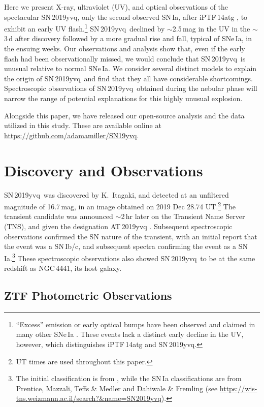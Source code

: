 \documentclass[twocolumn]{aastex63}
\newcommand{\sn}{SN\,2019yvq}
\begin{document}
Here we present X-ray, ultraviolet (UV), and optical observations of the
spectacular \sn, only the second observed SN\,Ia, after iPTF\,14atg
\citep{Cao15}, to exhibit an early UV flash.\footnote{``Excess'' emission or
early optical bumps have been observed and claimed in many other SNe\,Ia
\citep[e.g.,][]{Goobar15,Marion16,Hosseinzadeh17,Jiang17,Shappee19,
Dimitriadis19}. These events lack a distinct early decline in the UV, however,
which distinguishes iPTF\,14atg and \sn.} \sn\ declined by $\sim$2.5\,mag in
the UV in the $\sim$3\,d after discovery followed by a more gradual rise and
fall, typical of SNe\,Ia, in the ensuing weeks. Our observations and analysis
show that, even if the early flash had been observationally missed, we would
conclude that \sn\ is unusual relative to normal SNe\,Ia. We consider several
distinct models to explain the origin of \sn\ and find that they all have
considerable shortcomings. Spectroscopic observations of \sn\ obtained during
the nebular phase will narrow the range of potential explanations for this
highly unusual explosion.

Alongside this paper, we have released our open-source analysis and the data
utilized in this study. These are available online at
\href{https://github.com/adamamiller/SN19yvq}{\url{https://github.com/adamamiller/SN19yvq}}.

\section{Discovery and Observations}\label{sec:obs}

\sn\ was discovered by K.~Itagaki, and detected at an unfiltered magnitude
of 16.7\,mag, in an image obtained on 2019 Dec 28.74 UT.\footnote{UT times
are used throughout this paper.} The transient candidate was announced
$\sim$2\,hr later on the Transient Name Server (TNS), and given the
designation AT\,2019yvq \citep{Itagaki19}. Subsequent spectroscopic
observations confirmed the SN nature of the transient, with an initial
report that the event was a SN\,Ib/c, and subsequent spectra confirming the
event as a SN\,Ia.\footnote{The initial classification is from
\citet{Kawabata20}, while the SN\,Ia classifications are from Prentice,
Mazzali, Teffs \& Medler and Dahiwale \& Fremling (see
\url{https://wis-tns.weizmann.ac.il/search?&name=SN2019yvq}).} These
spectroscopic observations also showed \sn\ to be at the same redshift as
NGC\,4441, its host galaxy.

\subsection{ZTF Photometric Observations}
\end{document}
